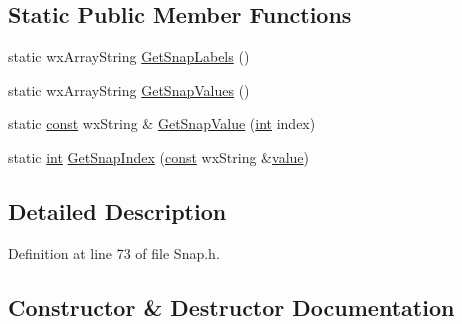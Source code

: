 \subsection*{Static Public Member Functions}
\begin{DoxyCompactItemize}
\item 
static wx\+Array\+String \hyperlink{class_snap_manager_ac8d5fac28a8b1fec8510f31ad1eada06}{Get\+Snap\+Labels} ()
\item 
static wx\+Array\+String \hyperlink{class_snap_manager_a41a480e6422ee9feb361059c2df1b9cc}{Get\+Snap\+Values} ()
\item 
static \hyperlink{getopt1_8c_a2c212835823e3c54a8ab6d95c652660e}{const} wx\+String \& \hyperlink{class_snap_manager_a8e346cfd1564e19c7c4ac9b3d8f6ac59}{Get\+Snap\+Value} (\hyperlink{xmltok_8h_a5a0d4a5641ce434f1d23533f2b2e6653}{int} index)
\item 
static \hyperlink{xmltok_8h_a5a0d4a5641ce434f1d23533f2b2e6653}{int} \hyperlink{class_snap_manager_aa5658c0fddfe0d2091ec3324fe379c3a}{Get\+Snap\+Index} (\hyperlink{getopt1_8c_a2c212835823e3c54a8ab6d95c652660e}{const} wx\+String \&\hyperlink{lib_2expat_8h_a4a30a13b813682e68c5b689b45c65971}{value})
\end{DoxyCompactItemize}


\subsection{Detailed Description}


Definition at line 73 of file Snap.\+h.



\subsection{Constructor \& Destructor Documentation}
